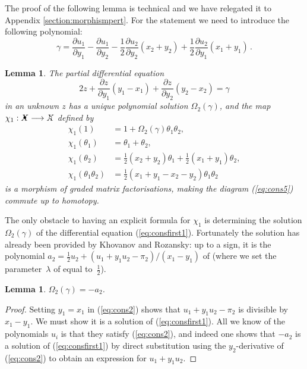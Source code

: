 \documentclass{compositio}
\newtheorem{lemma}[theorem]{Lemma}
\theoremstyle{definition}
\numberwithin{equation}{section}
\begin{document}
The proof of the following lemma is technical and we have relegated it to Appendix \ref{section:morphismpert}. For the statement we need to introduce the following polynomial:
\[
\gamma = \frac{\partial u_1}{\partial y_1} - \frac{\partial u_1}{\partial y_2} - \frac{1}{2} \frac{\partial u_2}{\partial y_2}(x_2 + y_2) + \frac{1}{2} \frac{\partial u_2}{\partial y_1}(x_1 + y_1) \, .
\]
\begin{lemma}\label{lemma:consfirst} The partial differential equation 
\begin{equation}\label{eq:consfirst1}
2 z + \frac{\partial z}{\partial y_1} (y_1 - x_1) + \frac{\partial z}{\partial y_2}(y_2 - x_2) = \gamma
\end{equation}
in an unknown $z$ has a unique polynomial solution $\Omega_2(\gamma)$, and the map $\chi_1: \Xbul \lto \Xcirc$ defined by
\begin{align*}
\chi_1(1) &= 1 + \Omega_2( \gamma )\theta_1 \theta_2,\\
\chi_1(\theta_1) &= \theta_1 + \theta_2,\\
\chi_1(\theta_2) &= \frac{1}{2}(x_2 + y_2)\theta_1 + \frac{1}{2}(x_1 + y_1)\theta_2,\\
\chi_1(\theta_1\theta_2) &= \frac{1}{2}(x_1 + y_1 - x_2 - y_2) \theta_1\theta_2
\end{align*}
is a morphism of graded matrix factorisations, making the diagram (\ref{eq:cons5}) commute up to homotopy.
\end{lemma}

The only obstacle to having an explicit formula for $\chi_1$ is determining the solution $\Omega_2(\gamma)$ of the differential equation (\ref{eq:consfirst1}). Fortunately the solution has already been provided by Khovanov and Rozansky: up to a sign, it is the polynomial $a_2 = \frac{1}{2}u_2 + (u_1 + y_1 u_2 - \pi_2)/(x_1-y_1)$ of \cite[p.51]{kr0401268} (where we set the parameter~$\lambda$ of \cite{kr0401268} equal to~$\frac{1}{2}$).

\begin{lemma} $\Omega_2(\gamma) = -a_2$.
\end{lemma}
\begin{proof}
Setting $y_1 = x_1$ in (\ref{eq:cons2}) shows that $u_1 + y_1 u_2 - \pi_2$ is divisible by $x_1 - y_1$. We must show it is a solution of (\ref{eq:consfirst1}). All we know of the polynomials $u_i$ is that they satisfy (\ref{eq:cons2}), and indeed one shows that $-a_2$ is a solution of (\ref{eq:consfirst1}) by direct substitution using the $y_2$-derivative of (\ref{eq:cons2}) to obtain an expression for $u_1 + y_1 u_2$.
\end{proof}
\end{document}
